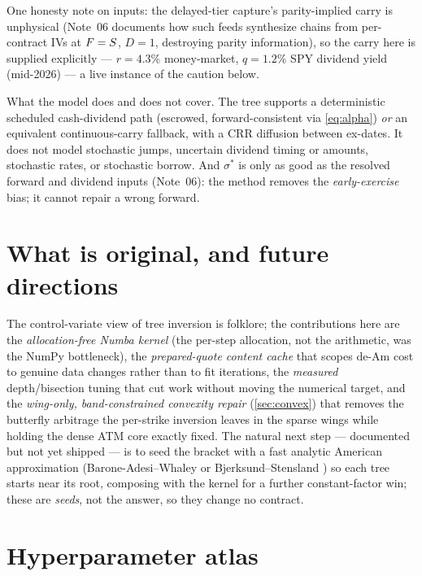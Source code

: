 \documentclass[11pt]{article}
\begin{document}
One honesty note on inputs: the delayed-tier capture's parity-implied carry is
unphysical (Note~06 documents how such feeds synthesize chains from
per-contract IVs at $F=S$, $D=1$, destroying parity information), so the
carry here is supplied explicitly --- $r=4.3\%$ money-market, $q=1.2\%$ SPY
dividend yield (mid-2026) --- a live instance of the caution below.

\begin{caution}
What the model does and does not cover. The tree supports a deterministic
scheduled cash-dividend path (escrowed, forward-consistent via
\cref{eq:alpha}) \emph{or} an equivalent continuous-carry fallback, with a CRR
diffusion between ex-dates. It does not model stochastic jumps, uncertain
dividend timing or amounts, stochastic rates, or stochastic borrow. And
$\sigma^*$ is only as good as the resolved forward and dividend inputs
(Note~06): the method removes the \emph{early-exercise} bias; it cannot repair
a wrong forward.
\end{caution}

\section{What is original, and future directions}
\label{sec:original}

The control-variate view of tree inversion is folklore; the contributions here
are the \emph{allocation-free Numba kernel} (the per-step allocation, not the
arithmetic, was the NumPy bottleneck), the \emph{prepared-quote content cache}
that scopes de-Am cost to genuine data changes rather than to fit iterations,
the \emph{measured} depth/bisection tuning that cut work without moving the
numerical target, and the \emph{wing-only, band-constrained convexity repair}
(\cref{sec:convex}) that removes the butterfly arbitrage the per-strike
inversion leaves in the sparse wings while holding the dense ATM core exactly
fixed. The natural next step --- documented but not yet shipped --- is to seed
the bracket with a fast analytic American approximation (Barone-Adesi--Whaley
\cite{BaroneAdesiWhaley1987} or Bjerksund--Stensland
\cite{BjerksundStensland2002}) so each tree starts near its root, composing
with the kernel for a further constant-factor win; these are \emph{seeds}, not
the answer, so they change no contract.

\appendix
\section{Hyperparameter atlas}
\label{app:atlas}
\end{document}

